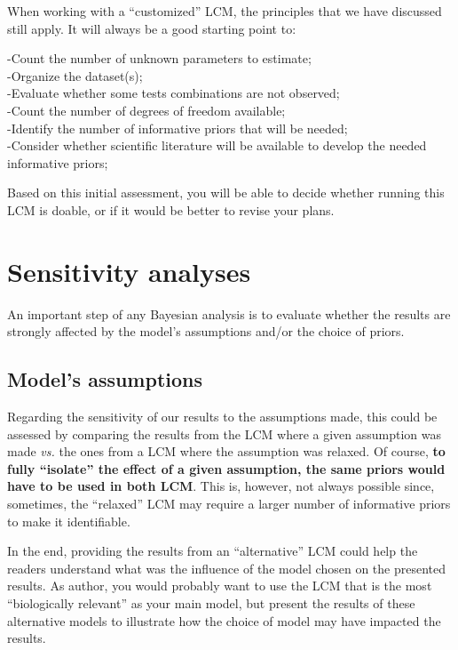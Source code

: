 \documentclass[
]{book}
\begin{document}
When working with a ``customized'' LCM, the principles that we have discussed still apply. It will always be a good starting point to:

-Count the number of unknown parameters to estimate;\\
-Organize the dataset(s);\\
-Evaluate whether some tests combinations are not observed;\\
-Count the number of degrees of freedom available;\\
-Identify the number of informative priors that will be needed;\\
-Consider whether scientific literature will be available to develop the needed informative priors;

Based on this initial assessment, you will be able to decide whether running this LCM is doable, or if it would be better to revise your plans.

\chapter{Sensitivity analyses}\label{sensitivity-analyses}

An important step of any Bayesian analysis is to evaluate whether the results are strongly affected by the model's assumptions and/or the choice of priors.

\section{Model's assumptions}\label{models-assumptions}

Regarding the sensitivity of our results to the assumptions made, this could be assessed by comparing the results from the LCM where a given assumption was made \emph{vs.} the ones from a LCM where the assumption was relaxed. Of course, \textbf{to fully ``isolate'' the effect of a given assumption, the same priors would have to be used in both LCM}. This is, however, not always possible since, sometimes, the ``relaxed'' LCM may require a larger number of informative priors to make it identifiable.

In the end, providing the results from an ``alternative'' LCM could help the readers understand what was the influence of the model chosen on the presented results. As author, you would probably want to use the LCM that is the most ``biologically relevant'' as your main model, but present the results of these alternative models to illustrate how the choice of model may have impacted the results.
\end{document}
